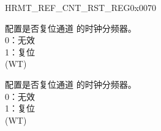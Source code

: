 \begin{register}{H}{RMT\_REF\_CNT\_RST\_REG}{0x0070}\label{regdesc:RMTREFCNTRSTREG}
%
%
%
%
%
\regnewline%
\begin{regdesc}\begin{reglist}
\label{fielddesc:RMTREFCNTRSTCHN}\item [RMT\_REF\_CNT\_RST\_CH\regindex{n}] 配置是否复位通道  的时钟分频器。\\
0：无效\\
1：复位\\
(WT)
\label{fielddesc:RMTREFCNTRSTCHM}\item [RMT\_REF\_CNT\_RST\_CH\regindex{m}] 配置是否复位通道  的时钟分频器。\\
0：无效\\
1：复位\\
(WT)
\end{reglist}\end{regdesc}
\end{register}


